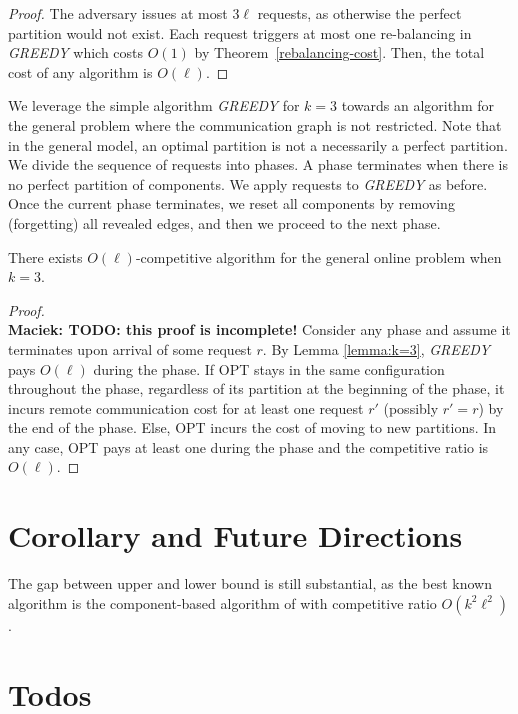 \documentclass[manuscript,screen=true]{acmart}
\newcommand\maciek[1]{\color{brown}\textbf{\\ Maciek: #1}\color{black}}
\begin{document}
\begin{proof}
	The adversary issues at most $3\ell$ requests, as otherwise the perfect partition would not exist.
	Each request triggers at most one re-balancing in \emph{GREEDY}
	which costs $O(1)$ by Theorem~\ref{rebalancing-cost}.
	Then,
	the total cost of any algorithm is $O(\ell)$.
\end{proof}

We leverage the simple algorithm \emph{GREEDY} for $k=3$
towards an algorithm for the general problem
where the communication graph is not restricted.
Note that in the general model,
an optimal partition is not a necessarily a perfect partition.
We divide the sequence of requests into phases.
A phase terminates when there is no perfect partition of components.
We apply requests to \emph{GREEDY} as before. 
Once the current phase terminates,
we reset all components by removing (forgetting) all revealed edges,
and then we proceed to the next phase.

\begin{theorem} \label{cor:k=3}
	There exists $O(\ell)$-competitive algorithm for the general online problem when $k=3$. 
\end{theorem}
\begin{proof}
  \maciek{TODO: this proof is incomplete!}
	Consider any phase and assume it terminates upon arrival of some request $r$.
	By Lemma  \ref{lemma:k=3},
	\emph{GREEDY} pays $O(\ell)$ during the phase.
	If OPT stays in the same configuration throughout the phase,
	regardless of its partition at the beginning of the phase,        
	it incurs remote communication cost for at least one request $r'$ (possibly $r'=r$) by the end of the phase.
	Else,
	OPT incurs the cost of moving to new partitions.
	In any case,
	OPT pays at least one during the phase and 
	the competitive ratio is $O(\ell)$.
\end{proof}


\section{Corollary and Future Directions}

The gap between upper and lower bound is still substantial, as the best known algorithm is the component-based algorithm of   \cite{repartition-disc} with competitive ratio $O(k^2\ell^2)$.


\section{Todos}
\end{document}
